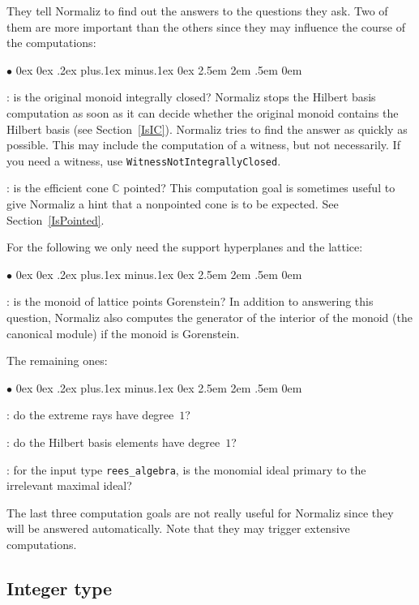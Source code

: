 \documentclass[12pt,a4paper]{scrartcl}
\newcommand{\stdli}{ \topsep0ex \partopsep0ex %
\parsep.2ex plus.1ex minus.1ex \itemsep0ex%
\leftmargin2.5em \labelwidth2em \labelsep.5em \rightmargin0em}%
\renewenvironment{itemize}{\begin{list}{{$\bullet$}}{\stdli}}{\end{list}}
\theoremstyle{definition}
\def\CC{{\mathbb C}}
\def\itemtt[#1]{\item[\textbf{\ttt{#1}}]}
\def\ttt{\texttt}
\begin{document}
They tell Normaliz to find out the answers to the questions they ask. Two of them are more important than the others since they may influence the course of the computations:

\begin{itemize}
	\itemtt[IsIntegrallyClosed, -w]: is the original monoid integrally closed? Normaliz stops the Hilbert basis computation as soon as it can decide whether the original monoid contains the Hilbert basis (see Section~\ref{IsIC}). Normaliz tries to find the answer as quickly as possible. This may include the computation of a witness, but not necessarily. If you need a witness, use \verb|WitnessNotIntegrallyClosed|.
	
	\itemtt[IsPointed]: is the efficient cone $\CC$ pointed? This computation goal is sometimes useful to give Normaliz a hint that a nonpointed cone is to be expected. See Section~\ref{IsPointed}.
\end{itemize}

For the following we only need the support hyperplanes and the lattice:

\begin{itemize}
	\itemtt[IsGorenstein, -G]: is the monoid of lattice points Gorenstein? In addition to answering this question, Normaliz also computes the generator of the interior of the monoid (the canonical module) if the monoid is Gorenstein.
\end{itemize}

The remaining ones:

\begin{itemize}
	
	\itemtt[IsDeg1ExtremeRays]: do the extreme rays have degree~$1$?
	
	\itemtt[IsDeg1HilbertBasis]: do the Hilbert basis elements have degree~$1$?
	
	\itemtt[IsReesPrimary]: for the input type \verb|rees_algebra|, is the monomial ideal primary to the irrelevant maximal ideal?
	
\end{itemize}

The last three computation goals are not really useful for Normaliz since they will be answered automatically. Note that they may trigger extensive computations.

\subsection{Integer type}\label{Integer}
\end{document}
